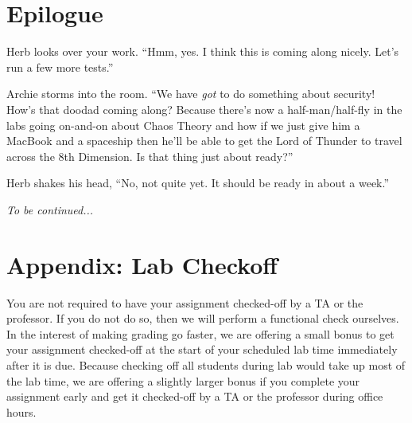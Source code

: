 \section*{Epilogue}

Herb looks over your work. ``Hmm, yes. I think this is coming along nicely.
Let's run a few more tests.''

Archie storms into the room. ``We have \textit{got} to do something about
security! How's that doodad coming along? Because there's now a
 half-man/half-fly in the labs going on-and-on about Chaos Theory and how if we
 just give him a MacBook and a spaceship then he'll be able to get the Lord of
 Thunder to travel across the 8th Dimension. Is that thing just about ready?''

Herb shakes his head, ``No, not quite yet. It should be ready in about a week.''

\textit{To be continued...}

\newpage

\section*{Appendix: Lab Checkoff}

You are not required to have your assignment checked-off by a TA or the
professor. If you do not do so, then we will perform a functional check
ourselves. In the interest of making grading go faster, we are offering a small
bonus to get your assignment checked-off at the start of your scheduled lab
time immediately after it is due. Because checking off all students during lab
would take up most of the lab time, we are offering a slightly larger bonus if
you complete your assignment early and get it checked-off by a TA or the
professor during office hours.

